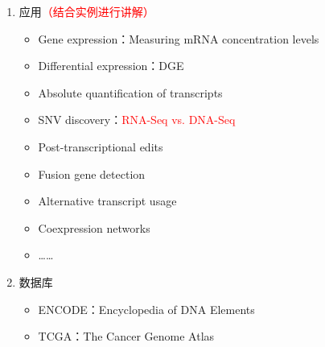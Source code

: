 \documentclass{TIJMUjiaoanLL}
\begin{document}
\begin{enumerate}
\begin{enumerate}
\otherTail
\newpage
\otherHeader

      \item 应用\textcolor{red}{（结合实例进行讲解）}
        \begin{itemize}
          \item Gene expression：Measuring mRNA concentration levels
          \item Differential expression：DGE
          \item Absolute quantification of transcripts
          \item SNV discovery：\textcolor{red}{RNA-Seq vs. DNA-Seq}
          \item Post-transcriptional edits
          \item Fusion gene detection
          \item Alternative transcript usage
          \item Coexpression networks
          \item ……
        \end{itemize}
      \item 数据库
        \begin{itemize}
          \item ENCODE：Encyclopedia of DNA Elements
          \item TCGA：The Cancer Genome Atlas
        \end{itemize}
    \end{enumerate}


\end{enumerate}
\end{document}
